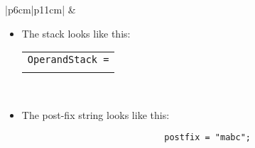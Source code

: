\begin{center}
\begin{longtable}{ |p{6cm}|p{11cm}| }
            &  
            \begin{itemize}
                \item The stack looks like this: 
                    {
                    \begin{center}
                        \begin{tabular}{ c }
                            \texttt{OperandStack =} \\ \\
                        \end{tabular}
                        \begin{bytefield}{10}
                             \\
                        \end{bytefield}
                    \end{center}
                    }
                
                \item The post-fix string looks like this: 
                    {
                        \begin{verbatim}
                            postfix = "mabc";
                        \end{verbatim}
                    }
            \end{itemize}
            \\
        \hline
        \hline
             \\
        

\end{longtable}
\end{center}

